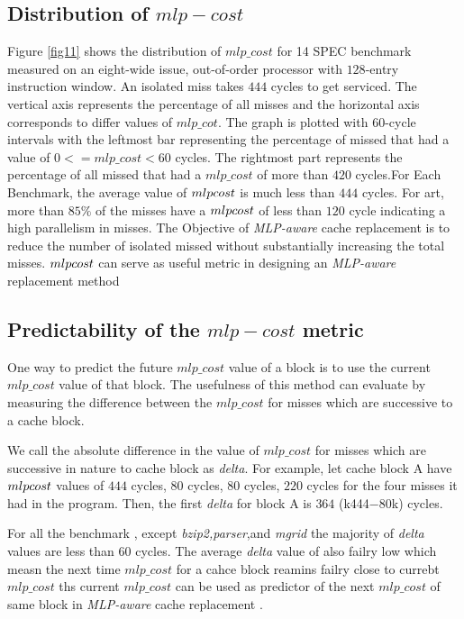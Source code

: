 \documentclass{report}
\begin{document}
\subsection{ Distribution of $mlp-cost$}
\vspace{.8cm}

Figure \ref{fig11} shows the distribution of $mlp\_cost$ for 
14 SPEC benchmark measured on an eight-wide issue, out-of-order processor with $128$-entry instruction window. An isolated miss takes $444$ cycles to get serviced. The vertical axis represents the percentage of all misses and the horizontal axis corresponds to differ values of $mlp\_cot $. The graph is plotted with $60$-cycle intervals with the leftmost bar representing the percentage of missed that had a value of $0<=mlp\_cost<60$ cycles. The rightmost part represents the percentage of all missed that had a $mlp\_cost$ of more than $420$ cycles.For Each Benchmark, the average value of $mlp\-cost$
is much less than $444$ cycles. For art, more than $85\%$ of the misses have a $mlp\-cost$ of less than $120$ cycle indicating a high parallelism in misses. The Objective of \emph{MLP-aware} cache replacement is to reduce the number of isolated missed without substantially increasing the total misses. $mlp\-cost$ can serve as useful metric in designing an  \emph{MLP-aware} replacement method

\subsection{Predictability of the $mlp-cost$ metric}

One way to predict the future $mlp\_cost$ value of a block is to use the current  $mlp\_cost$ value of that block. The usefulness of this method can evaluate by measuring the difference between the  $mlp\_cost$ for misses which are successive to a cache block. 


We call the absolute difference in the value of  $mlp\_cost$ for misses which are successive in nature to cache block as \emph{delta}.   For example, let cache block A have $mlp\-cost$ values of {$444$ cycles, $80$ cycles, $80$ cycles, $220$ cycles} for the four misses it had in the program. Then, the first \emph{delta} for block A is $364$ (k444−80k) cycles.
\vspace{.8cm}


For all the benchmark , except \emph{bzip2,parser},and \emph{mgrid} the majority of \emph{delta} values are less than $60$ cycles. The average \emph{delta} value of also failry low which measn the next time $mlp\_cost$ for a cahce block reamins  failry close to currebt $mlp\_cost$  ths current $mlp\_cost$ can be used as predictor of the next $mlp\_cost$ of same block in \emph{MLP-aware} cache replacement .
\end{document}
